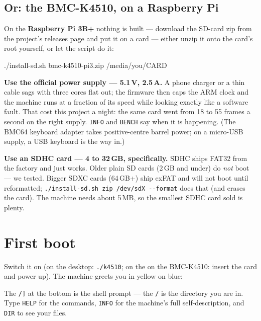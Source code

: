 \subsection*{Or: the BMC-K4510, on a Raspberry Pi}
On the \textbf{Raspberry Pi 3B+} nothing is built --- download the SD-card zip from the
project's releases page and put it on a card --- either unzip it onto the
card's root yourself, or let the script do it:
\begin{type}
./install-sd.sh bmc-k4510-pi3.zip /media/you/CARD
\end{type}

\begin{aside}
\textbf{Use the official power supply --- 5.1\,V, 2.5\,A.} A phone
charger or a thin cable sags with three cores flat out; the firmware
then caps the ARM clock and the machine runs at a fraction of its speed
while looking exactly like a software fault. That cost this project a
night: the same card went from 18 to 55 frames a second on the right
supply. \verb|INFO| and \verb|BENCH| say when it is happening. (The
BMC64 keyboard adapter takes positive-centre barrel power; on a
micro-USB supply, a USB keyboard is the way in.)

\textbf{Use an SDHC card --- 4 to 32\,GB, specifically.} SDHC ships
FAT32 from the factory and just works. Older plain SD cards (2\,GB and
under) do \emph{not} boot --- we tested. Bigger SDXC cards (64\,GB+)
ship exFAT and will not boot until reformatted;
\verb|./install-sd.sh zip /dev/sdX --format| does that (and erases the
card). The machine needs about 5\,MB, so the smallest SDHC card sold is
plenty.
\end{aside}

\section{First boot}
Switch it on (on the desktop: \verb|./k4510|; on the
on the BMC-K4510: insert the card and power up). The machine greets you in yellow on blue:


The \verb|/]| at the bottom is the shell prompt --- the \verb|/| is the
directory you are in. Type \verb|HELP| for the commands, \verb|INFO| for the
machine's full self-description, and \verb|DIR| to see your files.

